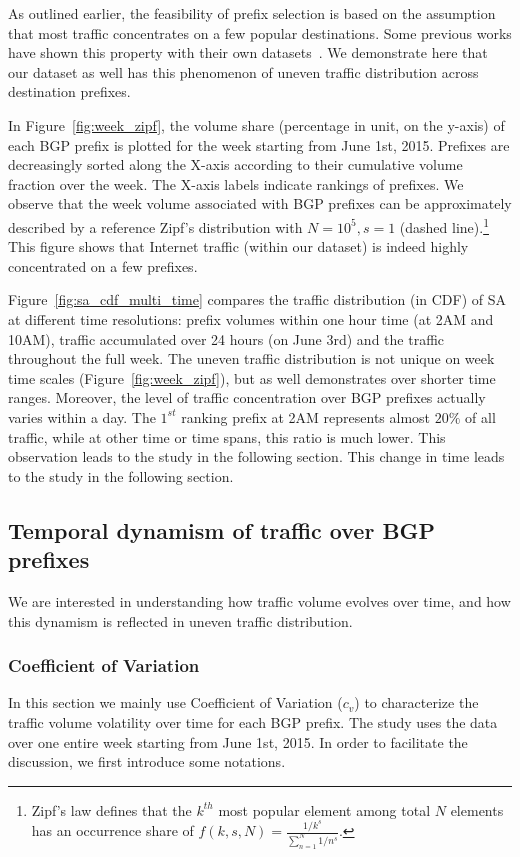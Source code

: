 As outlined earlier, the feasibility of prefix selection is based on the assumption that most traffic  concentrates on a few popular destinations.
Some previous works have shown this property with their own datasets~\cite{Fang1999,Feamster2003, Wallerich2006}. 
We demonstrate here that our dataset as well has this phenomenon of uneven traffic distribution across destination prefixes.

In Figure~\ref{fig:week_zipf}, the volume share (percentage in unit, on the y-axis) of each BGP prefix is plotted for the week starting from June 1st, 2015.
Prefixes are decreasingly sorted along the X-axis according to their cumulative volume fraction over the week.
The X-axis labels indicate rankings of prefixes.
We observe that the week volume associated with BGP prefixes can be approximately described by a reference Zipf's distribution with $N=10^5, s=1$ (dashed line).\footnote{Zipf's law defines that the $k^{th}$ most popular element among total $N$ elements has an occurrence share of $f(k,s,N)=\frac{1/k^s}{\sum_{n=1}^{N}1/n^s}$.} 
This figure shows that Internet traffic (within our dataset) is indeed highly concentrated on a few prefixes.



Figure~\ref{fig:sa_cdf_multi_time} compares the traffic distribution (in CDF) of SA at different time resolutions: prefix volumes within one hour time (at 2AM and 10AM), traffic accumulated over 24 hours (on June 3rd) and the traffic throughout the full week.
The uneven traffic distribution is not unique on week time scales (Figure~\ref{fig:week_zipf}), but as well demonstrates over shorter time ranges.
Moreover, the level of traffic concentration over BGP prefixes actually varies within a day.
The $1^{st}$ ranking prefix at 2AM represents almost $20\%$ of all traffic, while at other time or time spans, this ratio is much lower. This observation leads to the study in the following section.
This change in time leads to the study in the following section.

\subsection{Temporal dynamism of traffic over BGP prefixes}
\label{sec:dyna}
We are interested in understanding how traffic volume evolves over time, and how this dynamism is reflected in uneven traffic distribution.

\subsubsection{Coefficient of Variation}
In this section we mainly use Coefficient of Variation ($c_v$) to characterize the traffic volume volatility over time for each BGP prefix.
The study uses the data over one entire week starting from June 1st, 2015.
In order to facilitate the discussion, we first introduce some notations.

